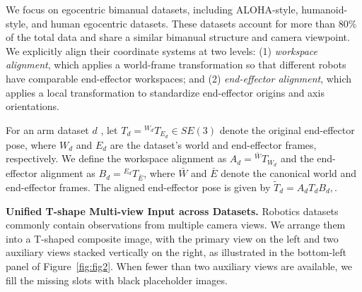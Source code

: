 We focus on egocentric bimanual datasets, including ALOHA-style,
humanoid-style, and human egocentric datasets. These datasets
account for more than \(80\%\) of the total data and share a
similar bimanual structure and camera viewpoint.
We explicitly align their coordinate systems at two levels:
(1) \textit{workspace alignment}, which applies a world-frame
transformation so that different robots have comparable
end-effector workspaces; and (2) \textit{end-effector alignment},
which applies a local transformation to standardize end-effector
origins and axis orientations. 


For an arm dataset \(d\) , let
\(T_d = {}^{W_d}T_{E_d} \in SE(3)\) denote the original
end-effector pose, where \(W_d\) and \(E_d\) are the dataset's
world and end-effector frames, respectively.
We define the workspace alignment as
\(A_d = {}^{\bar{W}}T_{W_d}\) and the end-effector alignment as
\(B_d = {}^{E_d}T_{\bar{E}}\), where \(\bar{W}\) and \(\bar{E}\)
denote the canonical world and end-effector frames.
The aligned end-effector pose is given by $\widetilde{T}_d = A_d T_d B_d,
    \label{eq:coordinate_alignment}$.



\textbf{Unified T-shape Multi-view Input across Datasets.} 
Robotics datasets commonly contain observations from multiple camera views. We arrange them into a T-shaped composite image, with the primary view on the left and two auxiliary views stacked vertically on the right, as illustrated in the bottom-left panel of Figure~\ref{fig:fig2}. When fewer than two auxiliary views are available, we fill the missing slots with black placeholder images.









